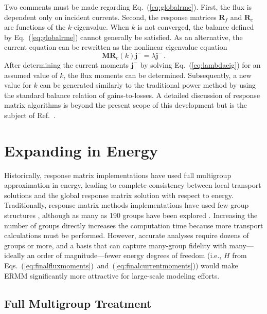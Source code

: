 \documentclass[5p,times,twocolumn,10pt]{elsarticle}
\newcommand{\EQ}[1]{Eq.~(\ref{#1})}               %
\newcommand{\EQSTWO}[2]{Eqs.~(\ref{#1})~and~(\ref{#2})}
\newcommand{\REF}[1]{Ref.~\citen{#1}}               %
\begin{document}
    Two comments must be made regarding \EQ{eq:globalrme}.  First, the flux is
    dependent only on incident currents. Second, the response matrices
    $\mathbf{R}_{f}$ and $\mathbf{R}_{c}$ are functions of the $k$-eigenvalue.
    When $k$ is not converged, the balance defined by \EQ{eq:globalrme} cannot
    generally be satisfied. As an alternative, the current equation can be
    rewritten as the nonlinear eigenvalue equation
    \begin{equation}
        \mathbf{MR}_{c}(k)   \mathbf{j}^- = \lambda \mathbf{j}^- \, .
        \label{eq:lambdaeig}
    \end{equation}
    After determining the current moments $\mathbf{j}^-$ by solving
    \EQ{eq:lambdaeig} for an assumed value of $k$, the flux moments can be
    determined. Subsequently, a new value for $k$ can be generated similarly to
    the traditional power method by using the standard balance relation of
    gains-to-losses. A detailed discussion of response matrix algorithms is
    beyond the present scope of this development but is the subject of
    \REF{RobertsSerment}.

    \section{Expanding in Energy}
    \label{sec:energy_expansion}

    Historically, response matrix implementations have used full multigroup
    approximation in energy, leading to complete consistency between local
    transport solutions and the global response matrix solution with respect
    to energy. Traditionally, response matrix methods implementations have used
    few-group structures \cite{ishii2009tdd, forget2006tdh}, although as many
    as 190 groups have been explored \cite{forget2004hcm}.  Increasing
    the number of groups directly increases the computation time because
    more transport calculations must be performed.  However,
    accurate analyses require dozens of groups or more, and a basis that can
    capture many-group fidelity with many---ideally an order of
    magnitude---fewer energy degrees of freedom (i.e., $H$ from
    \EQSTWO{eq:finalfluxmoments}{eq:finalcurrentmoments}) would make ERMM
    significantly more attractive for large-scale modeling efforts.

    \subsection{Full Multigroup Treatment}
\end{document}
